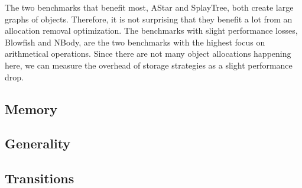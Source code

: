 The two benchmarks that benefit most, AStar and SplayTree, both create large graphs of objects.
Therefore, it is not surprising that they benefit a lot from an allocation removal optimization.
The benchmarks with slight performance losses, Blowfish and NBody, are the two benchmarks with the highest focus on arithmetical operations.
Since there are not many object allocations happening here, we can measure the overhead of storage strategies as a slight performance drop.






\subsection{Memory}





\subsection{Generality}






\subsection{Transitions}
